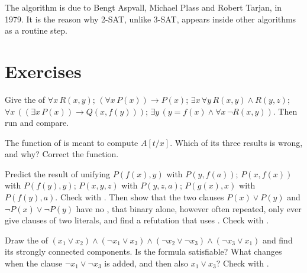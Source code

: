 The algorithm is due to Bengt Aspvall, Michael Plass and Robert Tarjan, in 1979. It is the reason why 2-SAT, unlike
3-SAT, appears inside other algorithms as a routine step.

\section{Exercises}\label{sec:b2:predicate-logic:exercises}

\begin{exercise}[$\star$]\label{exo:b2:predicate-logic:1}
Give the  of $\forall x\, R(x, y)$; $(\forall x\, P(x)) \to P(x)$; $\exists x\, \forall y\, R(x, y)
\wedge R(y, z)$; $\forall x\, ((\exists x\, P(x)) \to Q(x, f(y)))$; $\exists y\, (y = f(x) \wedge \forall x\, \neg R(x,
y))$. Then run  and compare.
\end{exercise}

\begin{exercise}[$\star$]\label{exo:b2:predicate-logic:2}
The function  of  is meant to compute $A[t/x]$. Which of its three results is wrong,
and why? Correct the function.
\end{exercise}

\begin{exercise}[$\star$]\label{exo:b2:predicate-logic:3}
Predict the result of unifying $P(f(x), y)$ with $P(y, f(a))$; $P(x, f(x))$ with $P(f(y), y)$; $P(x, y, z)$ with $P(y,
z, a)$; $P(g(x), x)$ with $P(f(y), a)$. Check with . Then show that the two clauses $P(x) \vee
P(y)$ and $\neg P(x) \vee \neg P(y)$ have no , that binary  alone, however often repeated,
only ever give clauses of two literals, and find a refutation that uses . Check with .
\end{exercise}

\begin{exercise}[$\star$]\label{exo:b2:predicate-logic:4}
Draw the  of $(x_1 \vee x_2) \wedge (\neg x_1 \vee x_3) \wedge (\neg x_2 \vee \neg x_3) \wedge (\neg x_3
\vee x_1)$ and find its strongly connected components. Is the formula satisfiable? What changes when the clause $\neg
x_1 \vee \neg x_3$ is added, and then also $x_1 \vee x_3$? Check with .
\end{exercise}

